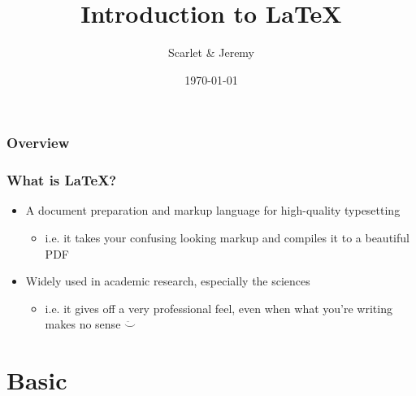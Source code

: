 \documentclass{beamer}
\title[Intro to \LaTeX]{Introduction to \LaTeX}
\author{Scarlet \& Jeremy}
\institute[Cornell University]{
Cornell University \\
\medskip
\textit{hy323 \& jlf248}
}
\date{\today}
\begin{document}
\begin{frame}
  \titlepage
\end{frame}

\begin{frame}
  \frametitle{Overview}
  \tableofcontents
\end{frame}

\begin{frame}
  \frametitle{What is \LaTeX?}
  \begin{itemize}
    \item A document preparation and markup language for high-quality typesetting
      \begin{itemize}
        \item i.e. it takes your confusing looking markup and compiles it to a beautiful PDF
      \end{itemize}
    \item Widely used in academic research, especially the sciences
      \begin{itemize}
        \item i.e. it gives off a very professional feel, even when what you're writing makes no sense $\ddot\smile$
      \end{itemize}
  \end{itemize}
\end{frame}

\section{Basic}
\end{document}
